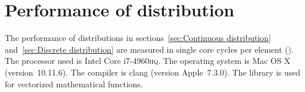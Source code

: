 %
%
%
%

\chapter{Performance of distribution}
\label{chap:Performance of distribution}

The performance of distributions in sections~\ref{sec:Continuous distribution}
and~\ref{sec:Discrete distribution} are measured in single core cycles per
element (\cpe). The processor used is Intel Core i7-4960\textsc{hq}. The
operating system is Mac OS X (version~10.11.6). The compiler is \llvm clang
(version Apple~7.3.0). The \mkl library is used for vectorized mathematical
functions.

